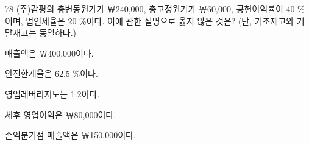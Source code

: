\begin{question}{78}
(주)감평의 총변동원가가 ￦240,000, 총고정원가가 ￦60,000, 공헌이익률이 40 \%이며, 법인세율은 20 \%이다. 이에 관한 설명으로 옳지 않은 것은? (단, 기초재고와 기말재고는 동일하다.)
\begin{choices}
  \item 매출액은 ￦400,000이다.
  \item 안전한계율은 62.5 \%이다.
  \item 영업레버리지도는 1.2이다.
  \item 세후 영업이익은 ￦80,000이다.
  \item 손익분기점 매출액은 ￦150,000이다.
\end{choices}
\end{question}
